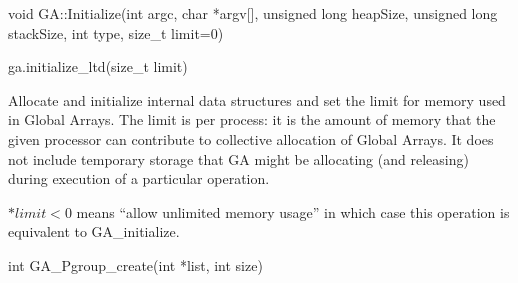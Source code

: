 \documentclass[10pt]{article}
\begin{document}
\begin{cxxapi}
\begin{cxxcode}
void GA::Initialize(int argc, char *argv[], unsigned long heapSize,
                    unsigned long stackSize, int type, size_t limit=0)
\end{cxxcode}
\begin{funcargs}
\end{funcargs}
\end{cxxapi}

\begin{pyapi}
\begin{pycode}
ga.initialize_ltd(size_t limit)
\end{pycode}
\begin{funcargs}
\end{funcargs}
\end{pyapi}

\gcoll

\begin{desc}

Allocate and initialize internal data structures and set the limit for memory
used in Global Arrays. The limit is per process: it is the amount of memory
that the given processor can contribute to collective allocation of Global
Arrays. It does not include temporary storage that GA might be allocating (and
releasing) during execution of a particular operation.

$*limit < 0$ means ``allow unlimited memory usage'' in which case this operation
is equivalent to GA_initialize.

\end{desc}



\begin{capi}
\begin{ccode}
int GA_Pgroup_create(int *list, int size)
\end{ccode}
\begin{funcargs}
\end{funcargs}
\end{capi}
\end{document}
